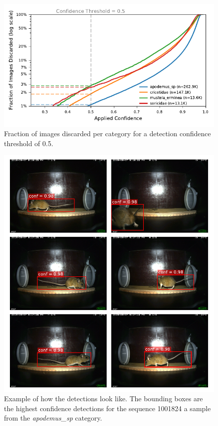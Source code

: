         \begin{figure}[ht]
        \centering
        \includegraphics{figures/discarded_img_by_conf.pdf}
        \caption{Fraction of images discarded per category for a detection confidence threshold of 0.5.}
        \label{fig:lost_images}
        \end{figure}

        \begin{figure}[ht]
        \centering
        \includegraphics{figures/detections_on_a_sequence.pdf}
        \caption{Example of how the detections look like. The bounding boxes are the highest confidence detections for the sequence 1001824 a sample from the \textit{apodemus\_sp} category.}
        \label{fig:detection_example}
        \end{figure}

